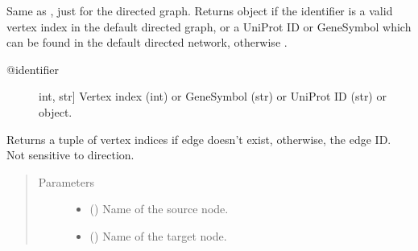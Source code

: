 \documentclass[letterpaper,10pt,english]{sphinxmanual}
\begin{document}
\begin{fulllineitems}
\begin{fulllineitems}
\label{\detokenize{reference:pypath.main.PyPath.dv}}
Same as , just for the directed graph.
Returns  object if the identifier
is a valid vertex index in the default directed graph,
or a UniProt ID or GeneSymbol which can be found in the
default directed network, otherwise .
\begin{description}
\item[{@identifier}] \leavevmode{[}int, str{]}
Vertex index (int) or GeneSymbol (str) or UniProt ID (str) or
 object.

\end{description}

\end{fulllineitems}


\begin{fulllineitems}
\label{\detokenize{reference:pypath.main.PyPath.dvs}}
\end{fulllineitems}


\begin{fulllineitems}
\label{\detokenize{reference:pypath.main.PyPath.edge_exists}}
Returns a tuple of vertex indices if edge doesn’t exist,
otherwise, the edge ID. Not sensitive to direction.
\begin{quote}\begin{description}
\item[{Parameters}] \leavevmode\begin{itemize}
\item {} 
 () \textendash{} Name of the source node.

\item {} 
 () \textendash{} Name of the target node.


\end{itemize}
\end{description}
\end{quote}
\end{fulllineitems}
\end{fulllineitems}
\end{document}
